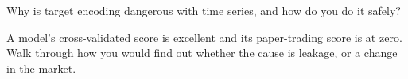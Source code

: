 \begin{interviewq}\label{iq:ml:validation:5}
Why is target encoding dangerous with time series, and how do you do it safely?
\end{interviewq}

\begin{interviewq}\label{iq:ml:validation:6}
A model's cross-validated score is excellent and its paper-trading score is at zero. Walk through how you would find
out whether the cause is leakage,  or a change in the market.
\end{interviewq}
